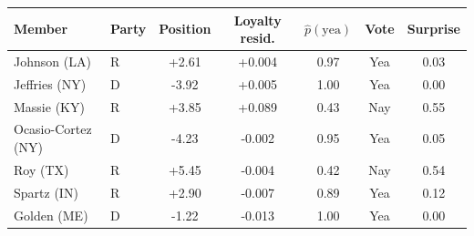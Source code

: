\begin{tabular}{llccccc}
\toprule
Member & Party & Position & Loyalty resid. & $\hat p(\text{yea})$ & Vote & Surprise \\
\midrule
Johnson (LA) & R & +2.61 & +0.004 & 0.97 & Yea & 0.03 \\
Jeffries (NY) & D & -3.92 & +0.005 & 1.00 & Yea & 0.00 \\
Massie (KY) & R & +3.85 & +0.089 & 0.43 & Nay & 0.55 \\
Ocasio-Cortez (NY) & D & -4.23 & -0.002 & 0.95 & Yea & 0.05 \\
Roy (TX) & R & +5.45 & -0.004 & 0.42 & Nay & 0.54 \\
Spartz (IN) & R & +2.90 & -0.007 & 0.89 & Yea & 0.12 \\
Golden (ME) & D & -1.22 & -0.013 & 1.00 & Yea & 0.00 \\
\bottomrule
\end{tabular}
